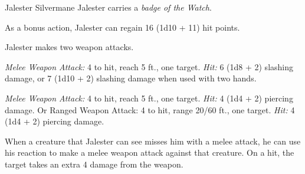 \documentclass[10pt,a4paper,twoside,bg=print,twocolumn,openany,nodeprecatedcode]{dndbook}
\begin{document}
\begin{DndMonster}[float=t]{Jalester Silvermane}
\DndMonsterBasics[
armor-class = {18 (\textit{chain mail})},
hit-points = {\DndDice{13d8 + 13}},
speed = {30 ft.}
]
\DndMonsterAbilityScores[
 str = 14,
 dex = 14,
 con = 13,
 int = 12,
 wis = 14,
 cha = 13
]
\DndMonsterDetails[
saving-throws = {Str +4, Con +3},
skills = {Athletics +4, Survival +4},
languages = {Common, Elvish},
challenge = 4,
]
Jalester carries a \textit{badge of the Watch}.

As a bonus action, Jalester can regain 16 (1d10 + 11) hit points.

Jalester makes two weapon attacks.

\textsl{Melee Weapon Attack:} 4 to hit, reach 5 ft., one target. \textsl{Hit:} 6 (1d8 + 2) slashing damage, or 7 (1d10 + 2) slashing damage when used with two hands.

\textsl{Melee Weapon Attack:} 4 to hit, reach 5 ft., one target. \textsl{Hit:} 4 (1d4 + 2) piercing damage. Or Ranged Weapon Attack: 4 to hit, range 20/60 ft., one target. \textsl{Hit:} 4 (1d4 + 2) piercing damage.

When a creature that Jalester can see misses him with a melee attack, he can use his reaction to make a melee weapon attack against that creature. On a hit, the target takes an extra 4 damage from the weapon.

\end{DndMonster}
\end{document}
